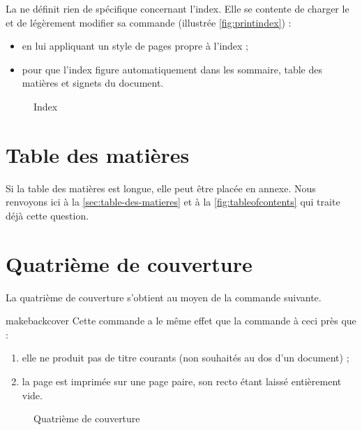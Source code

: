 La \yatcl{} ne définit rien de spécifique concernant l'index. Elle se contente
de charger le 
 et de légèrement
modifier sa commande  (illustrée
\vref{fig:printindex}) :
\begin{itemize}
\item en lui appliquant un style de pages propre à l'index ;
\item pour que l'index figure automatiquement dans les
  sommaire, table des matières et signets du document.
\end{itemize}

\begin{figure}[htbp]
  \centering
  \caption{Index}
  \label{fig:printindex}
\end{figure}

\section{Table des matières}

Si la table des matières est longue, elle peut être placée en
annexe. Nous renvoyons ici à la \vref{sec:table-des-matieres} et à
la \vref{fig:tableofcontents} qui traite déjà cette question.

\section{Quatrième de couverture}\label{sec:quatr-de-couv}

La quatrième de couverture s'obtient au moyen de la commande
 suivante.

\begin{docCommand}{makebackcover}{}
  Cette commande a le même effet que la commande 
  à ceci près que :
  \begin{enumerate}
  \item elle ne produit pas de titre courants (non souhaités au dos d'un
    document) ;
  \item la page est imprimée sur une page paire, son recto étant
    laissé entièrement vide.
  \end{enumerate}
\end{docCommand}

\begin{figure}[htbp]
  \centering
  \caption{Quatrième de couverture}
  \label{fig:makebackcover}
\end{figure}

%
\iffalse
\fi

